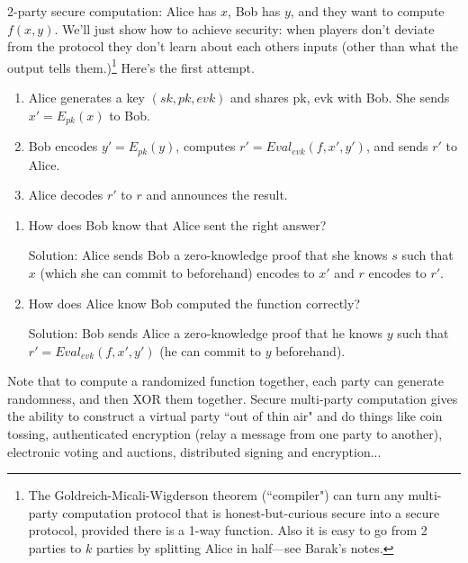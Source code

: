 2-party secure computation: Alice has $x$, Bob has $y$, and they want to compute $f(x,y)$. We'll just show how to achieve  security: when players don't deviate from the protocol they don't learn about each others inputs (other than what the output tells them.)\footnote{The Goldreich-Micali-Wigderson theorem (``compiler") can turn any multi-party computation protocol that is honest-but-curious secure into a secure protocol, provided there is a 1-way function. Also it is easy to go from 2 parties to $k$ parties by splitting Alice in half---see Barak's notes.}
Here's the first attempt.
\begin{enumerate}
\item
Alice generates a key $(sk,pk,evk)$ and shares pk, evk with Bob. She sends $x'=E_{pk}(x)$ to Bob.
\item
Bob encodes $y'=E_{pk}(y)$, computes $r'=Eval_{evk}(f,x',y')$, and sends $r'$ to Alice.
\item
Alice decodes $r'$ to $r$ and announces the result.
\end{enumerate}


\begin{enumerate}
\item
How does Bob know that Alice sent the right answer? 

Solution: Alice sends Bob a zero-knowledge proof that she knows $s$ such that $x$ (which she can commit to beforehand) encodes to $x'$ and $r$ encodes to $r'$.
\item
How does Alice know Bob computed the function correctly?

Solution: Bob sends Alice a zero-knowledge proof that he knows $y$ such that $r'=Eval_{evk}(f,x',y')$ (he can commit to $y$ beforehand).
\end{enumerate}
Note that to compute a randomized function together, each party can generate randomness, and then XOR them together. Secure multi-party computation gives the ability to construct a virtual party ``out of thin air" and do things like coin tossing, authenticated encryption (relay a message from one party to another), electronic voting and auctions, distributed signing and encryption...


%
 
%
\printbibliography
